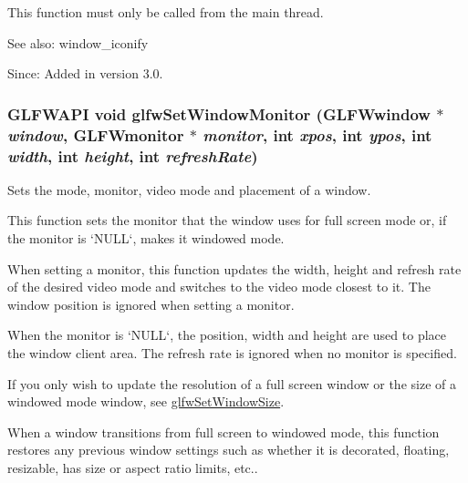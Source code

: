 This function must only be called from the main thread.

\begin{Desc}
\item[See also:]window\_\-iconify\end{Desc}
\begin{Desc}
\item[Since:]Added in version 3.0. \end{Desc}
\hypertarget{group__window_g12fabf78575e59c00f822f323ae0b6ae}{
\subsubsection[glfwSetWindowMonitor]{\setlength{\rightskip}{0pt plus 5cm}GLFWAPI void glfwSetWindowMonitor ({\bf GLFWwindow} $\ast$ {\em window}, \/  {\bf GLFWmonitor} $\ast$ {\em monitor}, \/  int {\em xpos}, \/  int {\em ypos}, \/  int {\em width}, \/  int {\em height}, \/  int {\em refreshRate})}}
\label{group__window_g12fabf78575e59c00f822f323ae0b6ae}


Sets the mode, monitor, video mode and placement of a window. 

This function sets the monitor that the window uses for full screen mode or, if the monitor is `NULL`, makes it windowed mode.

When setting a monitor, this function updates the width, height and refresh rate of the desired video mode and switches to the video mode closest to it. The window position is ignored when setting a monitor.

When the monitor is `NULL`, the position, width and height are used to place the window client area. The refresh rate is ignored when no monitor is specified.

If you only wish to update the resolution of a full screen window or the size of a windowed mode window, see \hyperlink{group__window_ge54d1f4915ded15e267ddd3f41496cd2}{glfwSetWindowSize}.

When a window transitions from full screen to windowed mode, this function restores any previous window settings such as whether it is decorated, floating, resizable, has size or aspect ratio limits, etc..

